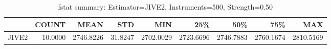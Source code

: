 \begin{table}[ht]
\centering
\caption{fstat summary: Estimator=JIVE2, Instruments=500, Strength=0.50}
\begin{tabular}{lrrrrrrrr}
\toprule
 & COUNT & MEAN & STD & MIN & 25\% & 50\% & 75\% & MAX \\
\midrule
JIVE2 & 10.0000 & 2746.8226 & 31.8247 & 2702.0029 & 2723.6696 & 2746.7883 & 2760.1674 & 2810.5169 \\
\bottomrule
\end{tabular}
\end{table}

